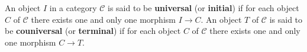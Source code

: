 \begin{definition}
An object $I$ in a category $\mathcal{C}$ is said to be \textbf{universal} (or \textbf{initial}) if for each object $C$ of $\mathcal{C}$ there exists one and only one morphism $I \rightarrow C$. An object $T$ of $\mathcal{C}$ is said to be \textbf{couniversal} (or \textbf{terminal}) if for each object $C$ of $\mathcal{C}$ there exists one and only one morphism $C \rightarrow T$.
\end{definition}
